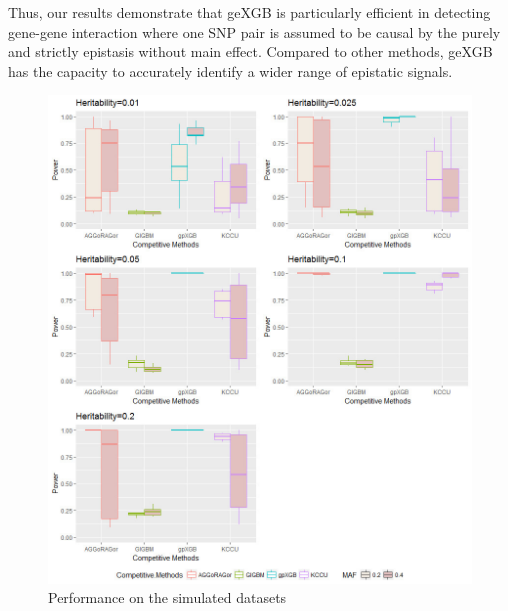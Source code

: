 \documentclass[11pt]{article}
\theoremstyle{plain}
\theoremstyle{definition}
\theoremstyle{remark}
\begin{document}
\noindent Thus, our results demonstrate that geXGB is particularly efficient in detecting gene-gene interaction where one SNP pair is assumed to be causal by the purely and strictly epistasis without main effect. Compared to other methods, geXGB has the capacity to accurately identify a wider range of epistatic signals.

\begin{figure}[H]
    \begin{center}
       \includegraphics[scale=0.6]{boxplot_10simu.jpg}
    \end{center}
\caption{\label{det}Performance on the simulated datasets}
\end{figure}
\end{document}
